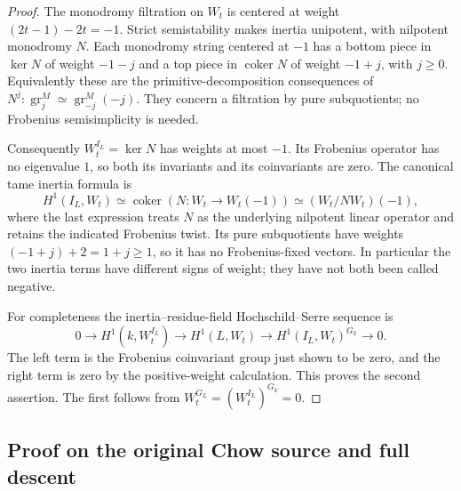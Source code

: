 \begin{proof}
The monodromy filtration on $W_t$ is centered at weight
$(2t-1)-2t=-1$. Strict semistability makes inertia unipotent, with
nilpotent monodromy $N$. Each monodromy string centered at $-1$ has
a bottom piece in $\ker N$ of weight $-1-j$ and a top piece in
$\operatorname{coker}N$ of weight $-1+j$, with $j\geq0$.
Equivalently these are the primitive-decomposition consequences of
$N^j:\operatorname{gr}_j^M\simeq
\operatorname{gr}_{-j}^M(-j)$. They concern a filtration by pure
subquotients; no Frobenius semisimplicity is needed.

Consequently $W_t^{I_L}=\ker N$ has weights at most $-1$.
Its Frobenius operator has no eigenvalue $1$, so both its invariants
and its coinvariants are zero. The canonical tame inertia formula is
\[
 H^1(I_L,W_t)\simeq\operatorname{coker}
       (N:W_t\to W_t(-1))
       \simeq (W_t/NW_t)(-1),
 \tag{TDR2.9}
\]
where the last expression treats $N$ as the underlying nilpotent
linear operator and retains the indicated Frobenius twist. Its pure
subquotients have weights $(-1+j)+2=1+j\geq1$, so it has no
Frobenius-fixed vectors. In particular the two inertia terms have
different signs of weight; they have not both been called negative.

For completeness the inertia--residue-field Hochschild--Serre sequence
is
\[
 0\to H^1(k,W_t^{I_L})\to H^1(L,W_t)
     \to H^1(I_L,W_t)^{G_k}\to0.
 \tag{TDR2.10}
\]
The left term is the Frobenius coinvariant group just shown to be zero,
and the right term is zero by the positive-weight calculation. This
proves the second assertion. The first follows from
$W_t^{G_L}=(W_t^{I_L})^{G_k}=0$.
\end{proof}

\subsection{Proof on the original Chow source and full descent}

